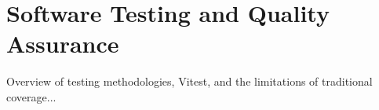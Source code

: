 \chapter{Software Testing and Quality Assurance}
\label{chap:testing_theory}

Overview of testing methodologies, Vitest, and the limitations of traditional coverage...
